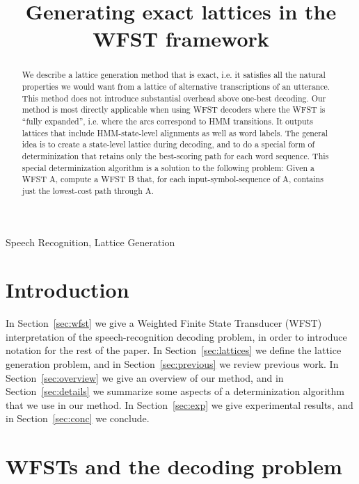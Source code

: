 \documentclass{article}
\title{Generating exact lattices in the WFST framework}
\begin{document}
\ninept  
%
\maketitle
%

\begin{abstract}
We describe a lattice generation method that is exact, i.e. it satisfies all the 
natural properties we would want from a lattice of alternative transcriptions of
an utterance.  This method does not introduce substantial overhead above one-best decoding.  Our method is
most directly applicable when using WFST decoders where the WFST is
``fully expanded'', i.e. where the arcs correspond to HMM transitions.  It outputs
lattices that include HMM-state-level alignments as well as word labels.
The general idea is to create a state-level lattice during decoding, and to do
a special form of determinization that retains only the best-scoring path
for each word sequence.  
This special determinization algorithm is a solution to the following problem:
Given a WFST A, compute a WFST B that, for each input-symbol-sequence of A,
contains just the lowest-cost path through A.
\end{abstract}

\begin{keywords}
  Speech Recognition, Lattice Generation
\end{keywords}

\vspace*{-0.075in}
\section{Introduction}
\vspace*{-0.05in}

In Section~\ref{sec:wfst} we give a Weighted Finite State Transducer
(WFST) interpretation of the speech-recognition decoding problem, in order
to introduce notation for the rest of the paper.  In Section~\ref{sec:lattices}
we define the lattice generation problem, and in Section~\ref{sec:previous}
we review previous work.
In Section~\ref{sec:overview} we give an overview of our method,
and in Section~\ref{sec:details} we summarize some aspects of a determinization
algorithm that we use in our method.  In Section~\ref{sec:exp} we give
experimental results, and in Section~\ref{sec:conc} we conclude.

\vspace*{-0.075in}
\section{WFSTs and the decoding problem}
\vspace*{-0.05in}
\label{sec:wfst}
\end{document}

